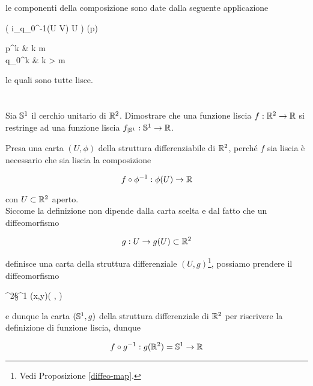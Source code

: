 le componenti della composizione sono date dalla seguente applicazione

%
	{\phi( i_{q_{0}}^{-1}(U \times V) \cap U )}{\R}%
	{\phi(p)}{%
		\begin{cases}
			p^{k} & k \leqslant m\\
			q_{0}^{k} & k > m
		\end{cases}%
	}

le quali sono tutte lisce.

\tocless\section{}\label{es2-7}

\begin{tcolorbox}
	Sia $ \S^{1} $ il cerchio unitario di $ \R^{2} $. Dimostrare che una funzione liscia $ f : \R^{2} \to \R $ si restringe ad una funzione liscia $ f_{|\S^{1}} : \S^{1} \to \R $.
\end{tcolorbox}

Presa una carta $ (U,\phi) $ della struttura differenziabile di $ \R^{2} $, perché $ f $ sia liscia è necessario che sia liscia la composizione

\begin{equation}
	f \circ \phi^{-1} : \phi(U) \to \R
\end{equation}

con $ U \subset \R^{2} $ aperto.\\
Siccome la definizione non dipende dalla carta scelta e dal fatto che un diffeomorfismo

\begin{equation}
	g : U \to g(U) \subset \R^{2}
\end{equation}

definisce una carta della struttura differenziale $ (U,g) $\footnote{%
	Vedi Proposizione \ref{diffeo-map}.%
}, possiamo prendere il diffeomorfismo

%
	{\R^{2}}{\S^{1}}%
	{(x,y)}{\left( , \right)}
	
e dunque la carta $ (\S^{1},g) $ della struttura differenziale di $ \R^{2} $ per riscrivere la definizione di funzione liscia, dunque

\begin{equation}
	f \circ g^{-1} : g(\R^{2}) = \S^{1} \to \R
\end{equation}

